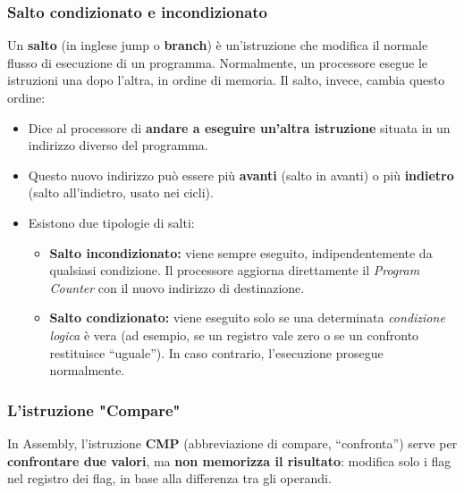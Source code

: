\documentclass[8pt]{article}
\begin{document}
\subsubsection{{\fontsize{12pt}{12pt}\selectfont Salto condizionato e incondizionato}}
Un \textbf{salto} (in inglese jump o \textbf{branch}) è un’istruzione che modifica il normale flusso di esecuzione di un programma. Normalmente, un processore esegue le istruzioni una dopo l'altra, in ordine di memoria.
Il salto, invece, cambia questo ordine:
\begin{itemize}[left=1em, itemsep=0.3em]
    \item Dice al processore di \textbf{andare a eseguire un’altra istruzione} situata in un indirizzo diverso del programma.
    \item Questo nuovo indirizzo può essere più \textbf{avanti} (salto in avanti) o più \textbf{indietro} (salto all’indietro, usato nei cicli).
    \item Esistono due tipologie di salti:
    \begin{itemize}[left=1em, itemsep=0.3em]
        \item \textbf{Salto incondizionato:} viene sempre eseguito, indipendentemente da qualsiasi condizione. Il processore aggiorna direttamente il \textit{Program Counter} con il nuovo indirizzo di destinazione.
        \item \textbf{Salto condizionato:} viene eseguito solo se una determinata \textit{condizione logica} è vera (ad esempio, se un registro vale zero o se un confronto restituisce “uguale”). In caso contrario, l’esecuzione prosegue normalmente.
    \end{itemize}
\end{itemize}

\vspace{0.3cm}
\subsubsection{{\fontsize{12pt}{12pt}\selectfont L'istruzione "Compare"}}
In Assembly, l’istruzione \textbf{CMP} (abbreviazione di compare, “confronta”) serve per \textbf{confrontare due valori}, ma \textbf{non memorizza il risultato}: modifica solo i {flag} nel registro dei flag, in base alla differenza tra gli operandi.
\end{document}
